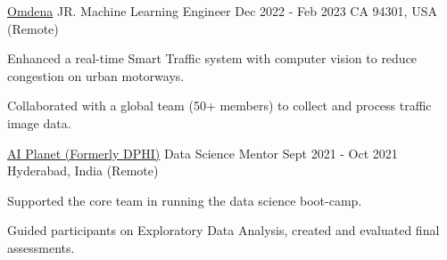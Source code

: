 \begin{cventries}
  \cventry
    {\href{https://omdena.com/}{Omdena}} %
    {JR. Machine Learning Engineer} %
    {Dec 2022 - Feb 2023} %
    {CA 94301, USA (Remote)} %
    {
      \begin{cvitems} 
        \item {Enhanced a real-time Smart Traffic system with computer vision to reduce congestion on urban motorways.}
        \item {Collaborated with a global team (50+ members) to collect and process traffic image data.}
      \end{cvitems}
    }
  \cventry
    {\href{https://aiplanet.com/}{AI Planet (Formerly DPHI)}} %
    {Data Science Mentor} %
    {Sept 2021 - Oct 2021} %
    {Hyderabad, India (Remote)} %
    {
      \begin{cvitems} 
        \item {Supported the core team in running the data science boot-camp.}
        \item{Guided participants on Exploratory Data Analysis, created and evaluated final assessments.}
      \end{cvitems}
    }
\end{cventries}
